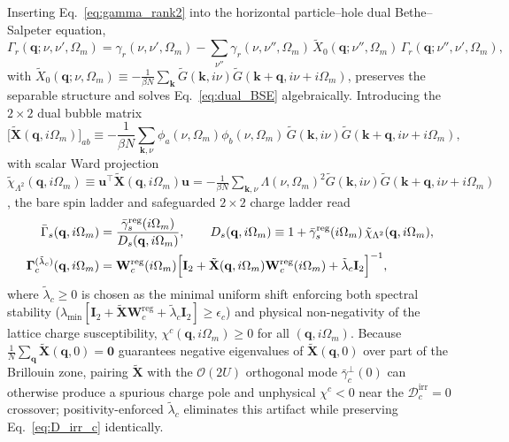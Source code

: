 \documentclass[11pt,a4paper]{article}
\numberwithin{equation}{section}
\theoremstyle{plain}
\theoremstyle{definition}
\providecommand{\vk}{\mathbf{k}}
\providecommand{\vq}{\mathbf{q}}
\begin{document}
Inserting Eq.~\eqref{eq:gamma_rank2} into the horizontal particle--hole dual
Bethe--Salpeter equation,
\begin{equation}
    \Gamma_r(\vq;\nu,\nu',\Omega_m)
    = \gamma_r(\nu,\nu',\Omega_m)
      - \sum_{\nu''}\gamma_r(\nu,\nu'',\Omega_m)\,
        \tilde{X}_0(\vq;\nu'',\Omega_m)\, \Gamma_r(\vq;\nu'',\nu',\Omega_m),
    \label{eq:dual_BSE}
\end{equation}
with $\tilde{X}_0(\vq;\nu,\Omega_m) \equiv -\frac{1}{\beta N}\sum_{\vk}\tilde{G}(\vk,i\nu)\tilde{G}(\vk+\vq,i\nu+i\Omega_m)$,
preserves the separable structure and solves Eq.~\eqref{eq:dual_BSE} algebraically.
Introducing the $2\times 2$ dual bubble matrix
\begin{equation}
    \bigl[\tilde{\mathbf{X}}(\vq,i\Omega_m)\bigr]_{ab}
    \equiv -\frac{1}{\beta N}\sum_{\vk,\nu}
           \phi_a(\nu,\Omega_m)\phi_b(\nu,\Omega_m)\,
           \tilde{G}(\vk,i\nu)\tilde{G}(\vk+\vq,i\nu+i\Omega_m),
    \label{eq:chi_tilde_mat}
\end{equation}
with scalar Ward projection
$\tilde{\chi}_{\Lambda^2}(\vq,i\Omega_m) \equiv \mathbf{u}^\top\tilde{\mathbf{X}}(\vq,i\Omega_m)\mathbf{u}
= -\frac{1}{\beta N}\sum_{\vk,\nu}\Lambda(\nu,\Omega_m)^2 \tilde{G}(\vk,i\nu)\tilde{G}(\vk+\vq,i\nu+i\Omega_m)$,
the bare spin ladder and safeguarded $2\times 2$ charge ladder read
\begin{align}
    \bar{\Gamma}_s(\vq,i\Omega_m)
    &= \frac{\bar{\gamma}_s^{\mathrm{reg}}(i\Omega_m)}{D_s(\vq,i\Omega_m)},
    \qquad
    D_s(\vq,i\Omega_m) \equiv 1 + \bar{\gamma}_s^{\mathrm{reg}}(i\Omega_m)\,\tilde{\chi}_{\Lambda^2}(\vq,i\Omega_m),
    \label{eq:Gamma_s_bare} \\
    \mathbf{\Gamma}_c^{(\tilde{\lambda}_c)}(\vq,i\Omega_m)
    &= \mathbf{W}_c^{\mathrm{reg}}(i\Omega_m)
       \Bigl[\mathbf{I}_2 + \tilde{\mathbf{X}}(\vq,i\Omega_m)\mathbf{W}_c^{\mathrm{reg}}(i\Omega_m)
             + \tilde{\lambda}_c \mathbf{I}_2\Bigr]^{-1},
    \label{eq:Gamma_c_mat}
\end{align}
where $\tilde{\lambda}_c \ge 0$ is chosen as the minimal uniform shift enforcing both
spectral stability ($\lambda_{\min}[\mathbf{I}_2 + \tilde{\mathbf{X}}\mathbf{W}_c^{\mathrm{reg}} + \tilde{\lambda}_c\mathbf{I}_2] \ge \epsilon_c$)
and physical non-negativity of the lattice charge susceptibility,
$\chi^c(\vq, i\Omega_m) \ge 0$ for all $(\vq, i\Omega_m)$. Because
$\frac{1}{N}\sum_{\vq}\tilde{\mathbf{X}}(\vq,0) = \mathbf{0}$ guarantees negative
eigenvalues of $\tilde{\mathbf{X}}(\vq,0)$ over part of the Brillouin zone, pairing
$\tilde{\mathbf{X}}$ with the $\mathcal{O}(2U)$ orthogonal mode $\bar{\gamma}_c^\perp(0)$
can otherwise produce a spurious charge pole and unphysical $\chi^c < 0$ near the
$\mathcal{D}_c^{\mathrm{irr}} = 0$ crossover; positivity-enforced $\tilde{\lambda}_c$
eliminates this artifact while preserving Eq.~\eqref{eq:D_irr_c} identically.
\end{document}
